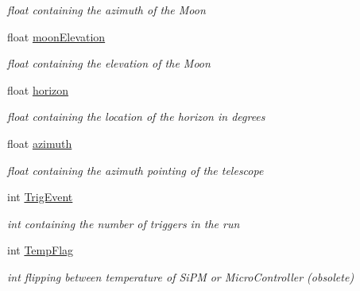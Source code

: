 \begin{DoxyCompactItemize}
\begin{DoxyCompactList}\small\item\em float containing the azimuth of the Moon \end{DoxyCompactList}\item 
\mbox{\label{classIEvent_a489a375ab5e89310b3295332f3984e85}} 
float \hyperlink{classIEvent_a489a375ab5e89310b3295332f3984e85}{moon\+Elevation}
\begin{DoxyCompactList}\small\item\em float containing the elevation of the Moon \end{DoxyCompactList}\item 
\mbox{\label{classIEvent_ab2c52a06033e4e772b583778dcad8cb9}} 
float \hyperlink{classIEvent_ab2c52a06033e4e772b583778dcad8cb9}{horizon}
\begin{DoxyCompactList}\small\item\em float containing the location of the horizon in degrees \end{DoxyCompactList}\item 
\mbox{\label{classIEvent_a83dc7ce1882703d9a5c5a73ac5183ed0}} 
float \hyperlink{classIEvent_a83dc7ce1882703d9a5c5a73ac5183ed0}{azimuth}
\begin{DoxyCompactList}\small\item\em float containing the azimuth pointing of the telescope \end{DoxyCompactList}\item 
\mbox{\label{classIEvent_afca5ec272f9a4d4e956bf01764d8a363}} 
int \hyperlink{classIEvent_afca5ec272f9a4d4e956bf01764d8a363}{Trig\+Event}
\begin{DoxyCompactList}\small\item\em int containing the number of triggers in the run \end{DoxyCompactList}\item 
\mbox{\label{classIEvent_adf8a6ebbadec0290c7b55f928d5e665f}} 
int \hyperlink{classIEvent_adf8a6ebbadec0290c7b55f928d5e665f}{Temp\+Flag}
\begin{DoxyCompactList}\small\item\em int flipping between temperature of Si\+PM or Micro\+Controller (obsolete) \end{DoxyCompactList}\item 

\end{DoxyCompactItemize}

